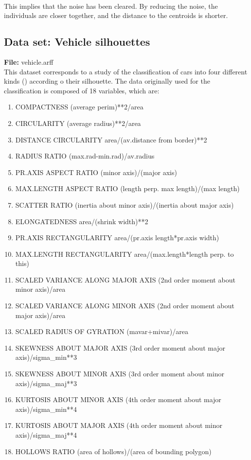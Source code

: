 \documentclass[12pt, a4paper]{article}
\begin{document}
\paragraph{}This implies that the noise has been cleared. By reducing the noise, the individuals are closer together, and the distance to the centroids is shorter.
\subsection{Data set: Vehicle silhouettes} %
\label{sub:data_set_vehicle_silhouettes}
\textbf{File:} vehicle.arff\\

This dataset corresponds to a study of the classification of cars into four different kinds () according o their silhouette. The data originally used for the classification is composed of 18 variables, which are:
\begin{enumerate}
	\item COMPACTNESS     (average perim)**2/area  
	\item CIRCULARITY     (average radius)**2/area
	\item DISTANCE CIRCULARITY    area/(av.distance from border)**2
	\item RADIUS RATIO    (max.rad-min.rad)/av.radius
	\item PR.AXIS ASPECT RATIO    (minor axis)/(major axis)
	\item MAX.LENGTH ASPECT RATIO (length perp. max length)/(max length)
	\item SCATTER RATIO   (inertia about minor axis)/(inertia about major axis)
	\item ELONGATEDNESS           area/(shrink width)**2
	\item PR.AXIS RECTANGULARITY  area/(pr.axis length*pr.axis width)
	\item MAX.LENGTH RECTANGULARITY area/(max.length*length perp. to this)
	\item SCALED VARIANCE ALONG MAJOR AXIS        (2nd order moment about minor axis)/area
	\item SCALED VARIANCE ALONG MINOR AXIS         (2nd order moment about major axis)/area
	\item SCALED RADIUS OF GYRATION       (mavar+mivar)/area
	\item SKEWNESS ABOUT MAJOR AXIS (3rd order moment about major axis)/sigma\_min**3
	\item SKEWNESS ABOUT MINOR AXIS (3rd order moment about minor axis)/sigma\_maj**3
	\item KURTOSIS ABOUT MINOR AXIS (4th order moment about major axis)/sigma\_min**4 
	\item KURTOSIS ABOUT MAJOR AXIS (4th order moment about minor axis)/sigma\_maj**4
	\item HOLLOWS RATIO   (area of hollows)/(area of bounding polygon)
\end{enumerate}
\end{document}

